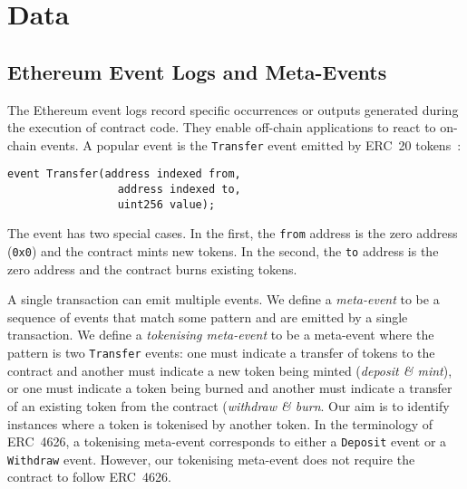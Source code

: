 \section{Data}\label{sec:data}

\subsection{Ethereum Event Logs and Meta-Events}\label{sec:data-event-logs}

The Ethereum event logs record specific occurrences or outputs
generated during the execution of contract code.  They enable
off-chain applications to react to on-chain events.  A popular event
is the \texttt{Transfer} event emitted by ERC~20
tokens~\cite{vogelsteller-buterin-15}:

\begin{lstlisting}[language=Solidity,
    caption={The ERC~20 \texttt{Transfer} event specifies three
      parameters: \texttt{from}, \texttt{to}, and \texttt{value}.}]
  event Transfer(address indexed from,
                 address indexed to,
                 uint256 value);
\end{lstlisting}

The event has two special cases.  In the first, the \texttt{from}
address is the zero address (\texttt{0x0}) and the contract mints new
tokens.  In the second, the \texttt{to} address is the zero address
and the contract burns existing tokens.

A single transaction can emit multiple events.  We define a
\textit{meta-event} to be a sequence of events that match some pattern
and are emitted by a single transaction.  We define a
\textit{tokenising meta-event} to be a meta-event where the pattern is
two \texttt{Transfer} events: one must indicate a transfer of tokens
to the contract and another must indicate a new token being minted
(\textit{deposit \& mint}), or one must indicate a token being burned
and another must indicate a transfer of an existing token from the
contract (\textit{withdraw \& burn}.  Our aim is to identify instances
where a token is tokenised by another token.  In the terminology of
ERC~4626, a tokenising meta-event corresponds to either a
\texttt{Deposit} event or a \texttt{Withdraw} event.  However, our
tokenising meta-event does not require the contract to follow
ERC~4626.

